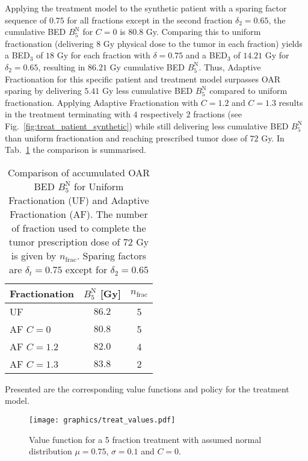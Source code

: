 \documentclass[\relativeRoot/ada.tex]{subfiles}
\begin{document}
Applying the treatment model to the synthetic patient with a sparing factor sequence of $0.75$ for all fractions except in the second fraction $\delta_2 = 0.65$, the cumulative BED $B_5^{\text{N}}$ for $C=0$ is $80.8$ Gy. Comparing this to uniform fractionation (delivering $8$ Gy physical dose to the tumor in each fraction) yields a BED$_3$ of $18$ Gy for each fraction with $\delta=0.75$ and a BED$_3$ of $14.21$ Gy for $\delta_2=0.65$, resulting in $86.21$ Gy cumulative BED $B_5^{\text{N}}$. Thus, Adaptive Fractionation for this specific patient and treatment model surpasses OAR sparing by delivering $5.41$ Gy less cumulative BED $B_5^{\text{N}}$ compared to uniform fractionation. Applying Adaptive Fractionation with $C=1.2$ and $C=1.3$ results in the treatment terminating with $4$ respectively $2$ fractions (see Fig.~\ref{fig:treat_patient_synthetic}) while still delivering less cumulative BED $B_5^{\text{N}}$ than uniform fractionation and reaching prescribed tumor dose of $72$ Gy. In Tab.~\ref{tab:result_treat_fraction_4} the comparison is summarised.

\begin{table}[!htb]
    \centering
    \caption{Comparison of accumulated OAR BED $B_5^{\text{N}}$ for Uniform Fractionation (UF) and Adaptive Fractionation (AF). The number of fraction used to complete the tumor prescription dose of $72$ Gy is given by $n_{\text{frac}}$. Sparing factors are $\delta_t=0.75$ except for $\delta_2=0.65$}
    \begin{tabular}{l|cc}
    \toprule
        Fractionation & $B_5^{\text{N}}$ [Gy] & $n_{\text{frac}}$ \\
    \midrule
       UF &  $86.2$ & 5 \\
       AF $C=0$ & $80.8$ & 5 \\
       AF $C=1.2$ & $82.0$ & 4 \\
       AF $C=1.3$ & $83.8$ & 2 \\
     
    \bottomrule
    \end{tabular}
    \label{tab:result_treat_fraction_4}
\end{table}

Presented are the corresponding value functions and policy for the treatment model.

\begin{figure}[!htb]
    \centering
    \texttt{[image: graphics/treat\_values.pdf]}
    \caption{Value function for a 5 fraction treatment with assumed normal distribution $\mu=0.75$, $\sigma=0.1$ and $C=0$.}
    \label{fig:treat_values}
\end{figure}
\end{document}
